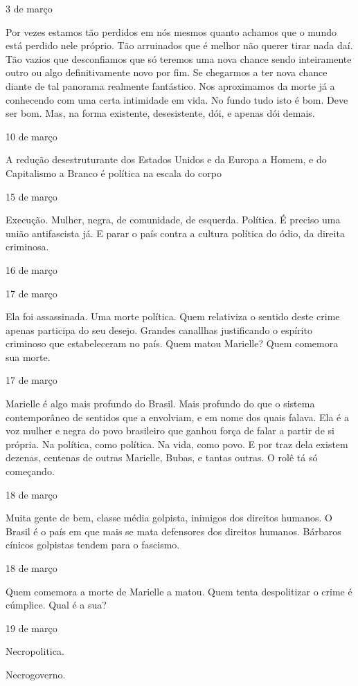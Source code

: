 3 de março

Por vezes estamos tão perdidos em nós mesmos quanto achamos que o mundo
está perdido nele próprio. Tão arruinados que é melhor não querer tirar
nada daí. Tão vazios que desconfiamos que só teremos uma nova chance
sendo inteiramente outro ou algo definitivamente novo por fim. Se
chegarmos a ter nova chance diante de tal panorama realmente fantástico.
Nos aproximamos da morte já a conhecendo com uma certa intimidade em
vida. No fundo tudo isto é bom. Deve ser bom. Mas, na forma existente,
desesistente, dói, e apenas dói demais.

10 de março

A redução desestruturante dos Estados Unidos e da Europa a Homem, e do
Capitalismo a Branco é política na escala do corpo

15 de março

Execução. Mulher, negra, de comunidade, de esquerda. Política. É preciso
uma união antifascista já. E parar o país contra a cultura política do
ódio, da direita criminosa.

16 de março

17 de março

Ela foi assassinada. Uma morte política. Quem relativiza o sentido deste
crime apenas participa do seu desejo. Grandes canallhas justificando o
espírito criminoso que estabeleceram no país. Quem matou Marielle? Quem
comemora sua morte.

17 de março

Marielle é algo mais profundo do Brasil. Mais profundo do que o sistema
contemporâneo de sentidos que a envolviam, e em nome dos quais falava.
Ela é a voz mulher e negra do povo brasileiro que ganhou força de falar
a partir de si própria. Na política, como política. Na vida, como povo.
E por traz dela existem dezenas, centenas de outras Marielle, Bubas, e
tantas outras. O rolê tá só começando.

18 de março

Muita gente de bem, classe média golpista, inimigos dos direitos
humanos. O Brasil é o país em que mais se mata defensores dos direitos
humanos. Bárbaros cínicos golpistas tendem para o fascismo.

18 de março

Quem comemora a morte de Marielle a matou. Quem tenta despolitizar o
crime é cúmplice. Qual é a sua?

19 de março

Necropolitica.

Necrogoverno.

